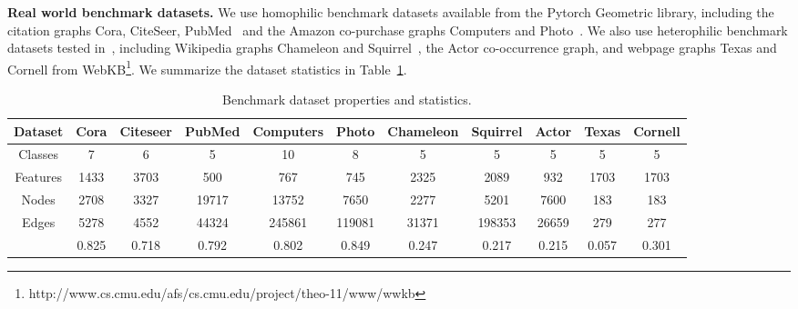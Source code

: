 \documentclass{article} \usepackage{iclr2021_conference,times}
\begin{document}
\textbf{Real world benchmark datasets. } We use  homophilic benchmark datasets available from the Pytorch Geometric library, including the citation graphs Cora, CiteSeer, PubMed~\citep{sen2008collective,yang2016revisiting} and the Amazon co-purchase graphs Computers and Photo~\citep{mcauley2015image,shchur2018pitfalls}. We also use  heterophilic benchmark datasets tested in~\citet{pei2019geom}, including Wikipedia graphs Chameleon and Squirrel~\citep{musae}, the Actor co-occurrence graph, and webpage graphs Texas and Cornell from WebKB\footnote{http://www.cs.cmu.edu/afs/cs.cmu.edu/project/theo-11/www/wwkb}. We summarize the dataset statistics in Table~\ref{tab:dataset_stats}.
\begin{table}[th]
\setlength{\tabcolsep}{4pt}
\centering
\small
\caption{Benchmark dataset properties and statistics.}\label{tab:dataset_stats}
\vspace{0.05in}
\begin{tabular}[t]{c|cccccccccc}
Dataset & Cora & Citeseer & PubMed   & Computers & Photo & Chameleon & Squirrel & Actor & Texas & Cornell\\
\midrule
Classes          & 7        & 6          & 5         & 10        & 8    & 5 & 5 & 5  & 5    &5\\
Features         & 1433     & 3703         & 500      & 767       & 745    &2325   &2089   &932    &1703   &1703\\
Nodes            & 2708     & 3327        & 19717     & 13752     & 7650   &2277   &5201    &7600  &183    &183\\
Edges            & 5278     & 4552       & 44324    & 245861    & 119081 &31371 &198353 &26659  &279    &277\\
         & 0.825   & 0.718     & 0.792    & 0.802    & 0.849 &0.247 & 0.217 &0.215  &0.057  &0.301\\
\end{tabular}
\normalsize
\vspace{-0.3cm}
\end{table}
\end{document}
